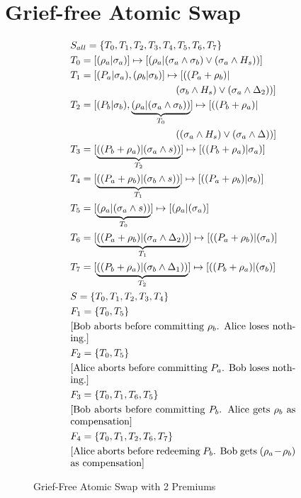 \section{Grief-free Atomic Swap}
\begin{figure}[hbt!]
    \centering
    \caption{Grief-Free Atomic Swap with 2 Premiums}
    \label{fig:grief_free_swap}
\begin{align*}
    &S_{all} = \{T_0, T_1, T_2, T_3, T_4, T_5, T_6, T_7\} \\
    &T_0 = [(\rho_a|\sigma_a)] \mapsto [(\rho_a|(\sigma_a \land \sigma_b) \lor (\sigma_a \land H_{s}))] \\
    &T_1 = [(P_a|\sigma_a), (\rho_b|\sigma_b)] \mapsto [((P_a+\rho_b)| \\
    &\phantomrel{=============} {} (\sigma_b \land H_{s}) \lor (\sigma_a \land \Delta_2))]\\
    &T_2 = [(P_b|\sigma_b), \underbrace{(\rho_a|(\sigma_a \land \sigma_b))}_{T_0}] \mapsto [((P_b+\rho_a)| \\
    &\phantomrel{=============} {} ((\sigma_a \land H_{s}) \lor (\sigma_a \land \Delta))]\\
    &T_3 = [\underbrace{((P_b+\rho_a)|(\sigma_a \land s))}_{T_2}] \mapsto [((P_b+\rho_a)|\sigma_a)]\\
    &T_4 = [\underbrace{((P_a+\rho_b)|(\sigma_b \land s))}_{T_1}] \mapsto [((P_a+\rho_b)|\sigma_b)]\\
    &T_5 = [\underbrace{(\rho_a|(\sigma_a \land s))}_{T_0}] \mapsto [(\rho_a|(\sigma_a)] \\
    &T_6 = [\underbrace{((P_a+\rho_b)|(\sigma_a \land \Delta_2))}_{T_1}] \mapsto [((P_a + \rho_b)|(\sigma_a)] \\
    &T_7 = [\underbrace{((P_b+\rho_a)|(\sigma_b \land \Delta_1))}_{T_2}] \mapsto [((P_b + \rho_a)|(\sigma_b)] \\
    &S = \{T_0, T_1, T_2, T_3, T_4\} \\
    &F_1 = \{T_0, T_5\} \\
    &\text{\parbox{8cm}{[Bob aborts before committing $\rho_b$. Alice loses nothing.]}} \\
    &F_2 = \{T_0, T_5\} \\ 
    &\text{\parbox{8cm}{[Alice aborts before committing $P_a$. Bob loses nothing.]}} \\
    &F_3 = \{T_0, T_1, T_6, T_5\} \\ 
    &\text{\parbox{8cm}{[Bob aborts before committing $P_b$. Alice gets $\rho_b$ as compensation]}} \\
    &F_4 = \{T_0, T_1, T_2, T_6, T_7\} \\ 
    &\text{\parbox{8cm}{[Alice aborts before redeeming $P_b$. Bob gets ($\rho_a-\rho_b$) as compensation]}}
\end{align*}
\end{figure}


